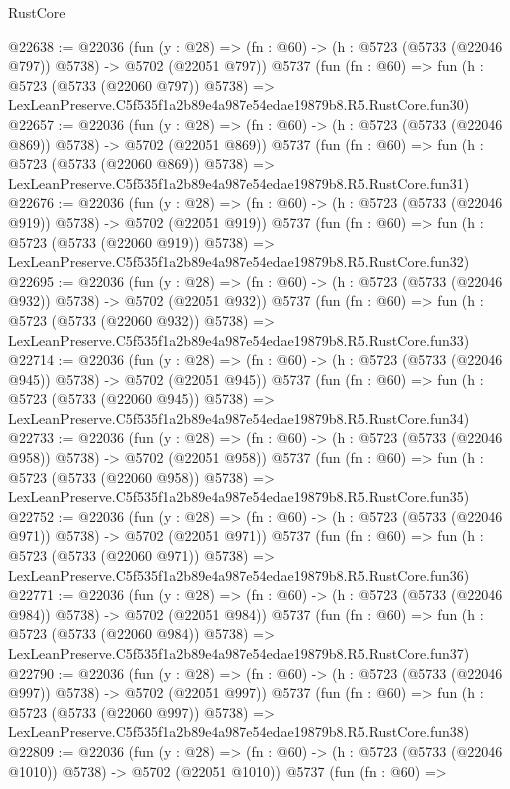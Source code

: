 \begin{lexlean}{RustCore}
\begin{coremodule}
@22638 := @22036
    (fun (y : @28) => (fn : @60) -> (h : @5723 (@5733 (@22046 @797)) @5738) -> @5702 (@22051 @797))
    @5737
    (fun (fn : @60) =>
    fun (h : @5723 (@5733 (@22060 @797)) @5738) =>
    LexLeanPreserve.C5f535f1a2b89e4a987e54edae19879b8.R5.RustCore.fun30)
@22657 := @22036
    (fun (y : @28) => (fn : @60) -> (h : @5723 (@5733 (@22046 @869)) @5738) -> @5702 (@22051 @869))
    @5737
    (fun (fn : @60) =>
    fun (h : @5723 (@5733 (@22060 @869)) @5738) =>
    LexLeanPreserve.C5f535f1a2b89e4a987e54edae19879b8.R5.RustCore.fun31)
@22676 := @22036
    (fun (y : @28) => (fn : @60) -> (h : @5723 (@5733 (@22046 @919)) @5738) -> @5702 (@22051 @919))
    @5737
    (fun (fn : @60) =>
    fun (h : @5723 (@5733 (@22060 @919)) @5738) =>
    LexLeanPreserve.C5f535f1a2b89e4a987e54edae19879b8.R5.RustCore.fun32)
@22695 := @22036
    (fun (y : @28) => (fn : @60) -> (h : @5723 (@5733 (@22046 @932)) @5738) -> @5702 (@22051 @932))
    @5737
    (fun (fn : @60) =>
    fun (h : @5723 (@5733 (@22060 @932)) @5738) =>
    LexLeanPreserve.C5f535f1a2b89e4a987e54edae19879b8.R5.RustCore.fun33)
@22714 := @22036
    (fun (y : @28) => (fn : @60) -> (h : @5723 (@5733 (@22046 @945)) @5738) -> @5702 (@22051 @945))
    @5737
    (fun (fn : @60) =>
    fun (h : @5723 (@5733 (@22060 @945)) @5738) =>
    LexLeanPreserve.C5f535f1a2b89e4a987e54edae19879b8.R5.RustCore.fun34)
@22733 := @22036
    (fun (y : @28) => (fn : @60) -> (h : @5723 (@5733 (@22046 @958)) @5738) -> @5702 (@22051 @958))
    @5737
    (fun (fn : @60) =>
    fun (h : @5723 (@5733 (@22060 @958)) @5738) =>
    LexLeanPreserve.C5f535f1a2b89e4a987e54edae19879b8.R5.RustCore.fun35)
@22752 := @22036
    (fun (y : @28) => (fn : @60) -> (h : @5723 (@5733 (@22046 @971)) @5738) -> @5702 (@22051 @971))
    @5737
    (fun (fn : @60) =>
    fun (h : @5723 (@5733 (@22060 @971)) @5738) =>
    LexLeanPreserve.C5f535f1a2b89e4a987e54edae19879b8.R5.RustCore.fun36)
@22771 := @22036
    (fun (y : @28) => (fn : @60) -> (h : @5723 (@5733 (@22046 @984)) @5738) -> @5702 (@22051 @984))
    @5737
    (fun (fn : @60) =>
    fun (h : @5723 (@5733 (@22060 @984)) @5738) =>
    LexLeanPreserve.C5f535f1a2b89e4a987e54edae19879b8.R5.RustCore.fun37)
@22790 := @22036
    (fun (y : @28) => (fn : @60) -> (h : @5723 (@5733 (@22046 @997)) @5738) -> @5702 (@22051 @997))
    @5737
    (fun (fn : @60) =>
    fun (h : @5723 (@5733 (@22060 @997)) @5738) =>
    LexLeanPreserve.C5f535f1a2b89e4a987e54edae19879b8.R5.RustCore.fun38)
@22809 := @22036
    (fun (y : @28) =>
    (fn : @60) -> (h : @5723 (@5733 (@22046 @1010)) @5738) -> @5702 (@22051 @1010))
    @5737
    (fun (fn : @60) =>

\end{coremodule}
\end{lexlean}
